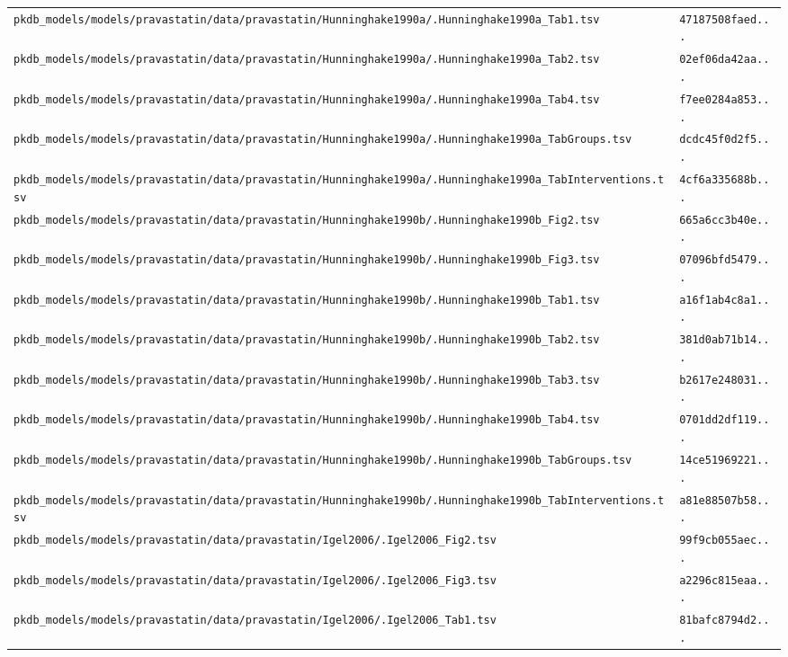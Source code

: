 \begin{longtable}{ll}
\texttt{pkdb\_models/models/pravastatin/data/pravastatin/Hunninghake1990a/.Hunninghake1990a\_Tab1.tsv} & \texttt{47187508faed...} \\
\texttt{pkdb\_models/models/pravastatin/data/pravastatin/Hunninghake1990a/.Hunninghake1990a\_Tab2.tsv} & \texttt{02ef06da42aa...} \\
\texttt{pkdb\_models/models/pravastatin/data/pravastatin/Hunninghake1990a/.Hunninghake1990a\_Tab4.tsv} & \texttt{f7ee0284a853...} \\
\texttt{pkdb\_models/models/pravastatin/data/pravastatin/Hunninghake1990a/.Hunninghake1990a\_TabGroups.tsv} & \texttt{dcdc45f0d2f5...} \\
\texttt{pkdb\_models/models/pravastatin/data/pravastatin/Hunninghake1990a/.Hunninghake1990a\_TabInterventions.tsv} & \texttt{4cf6a335688b...} \\
\texttt{pkdb\_models/models/pravastatin/data/pravastatin/Hunninghake1990b/.Hunninghake1990b\_Fig2.tsv} & \texttt{665a6cc3b40e...} \\
\texttt{pkdb\_models/models/pravastatin/data/pravastatin/Hunninghake1990b/.Hunninghake1990b\_Fig3.tsv} & \texttt{07096bfd5479...} \\
\texttt{pkdb\_models/models/pravastatin/data/pravastatin/Hunninghake1990b/.Hunninghake1990b\_Tab1.tsv} & \texttt{a16f1ab4c8a1...} \\
\texttt{pkdb\_models/models/pravastatin/data/pravastatin/Hunninghake1990b/.Hunninghake1990b\_Tab2.tsv} & \texttt{381d0ab71b14...} \\
\texttt{pkdb\_models/models/pravastatin/data/pravastatin/Hunninghake1990b/.Hunninghake1990b\_Tab3.tsv} & \texttt{b2617e248031...} \\
\texttt{pkdb\_models/models/pravastatin/data/pravastatin/Hunninghake1990b/.Hunninghake1990b\_Tab4.tsv} & \texttt{0701dd2df119...} \\
\texttt{pkdb\_models/models/pravastatin/data/pravastatin/Hunninghake1990b/.Hunninghake1990b\_TabGroups.tsv} & \texttt{14ce51969221...} \\
\texttt{pkdb\_models/models/pravastatin/data/pravastatin/Hunninghake1990b/.Hunninghake1990b\_TabInterventions.tsv} & \texttt{a81e88507b58...} \\
\texttt{pkdb\_models/models/pravastatin/data/pravastatin/Igel2006/.Igel2006\_Fig2.tsv} & \texttt{99f9cb055aec...} \\
\texttt{pkdb\_models/models/pravastatin/data/pravastatin/Igel2006/.Igel2006\_Fig3.tsv} & \texttt{a2296c815eaa...} \\
\texttt{pkdb\_models/models/pravastatin/data/pravastatin/Igel2006/.Igel2006\_Tab1.tsv} & \texttt{81bafc8794d2...} \\

\end{longtable}
